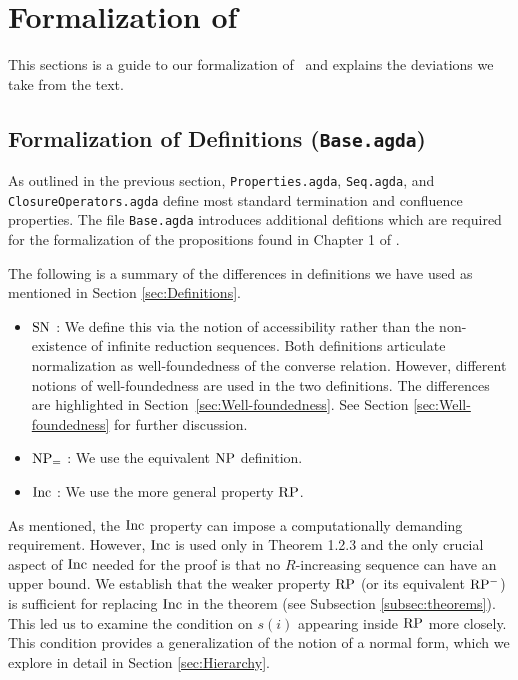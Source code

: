 \section{Formalization of \terese}
\label{sec:Formalization}
This sections is a guide to our formalization of \terese $\,$ and explains the deviations we take from the text. 

\subsection{Formalization of Definitions (\texttt{Base.agda})}\label{subsec:def}

As outlined in the previous section, \texttt{Properties.agda}, \texttt{Seq.agda}, and \texttt{ClosureOperators.agda} define most standard termination and confluence properties. The file \texttt{Base.agda} introduces additional defitions which are required for the formalization of the propositions found in Chapter 1 of \terese.


The following is a summary of the differences in definitions we have used as mentioned in Section \ref{sec:Definitions}.
\begin{itemize}
    \item $\mathrm{SN}$ : We define this via the notion of accessibility rather than the non-existence of infinite reduction sequences. Both definitions articulate normalization as well-foundedness of the converse relation. However, different notions of well-foundedness are used in the two definitions. The differences are highlighted in Section~\ref{sec:Well-foundedness}.
     See Section \ref{sec:Well-foundedness} for further discussion.
    \item $\mathrm{NP_=}$ : We use the equivalent $\mathrm{NP}$ definition.
    \item $\mathrm{Inc}$ : We use the more general property $\mathrm{RP}$.
\end{itemize}

As mentioned, the $\mathrm{Inc}$ property can impose a computationally demanding requirement. However, $\mathrm{Inc}$ is used only in Theorem 1.2.3
and the only crucial aspect of $\mathrm{Inc}$ needed for the proof is that no $R$-increasing
sequence can have an upper bound.
We establish that the weaker property $\mathrm{RP}$ (or its equivalent $\mathrm{RP^{-}}$) is sufficient for replacing $\mathrm{Inc}$ in the theorem (see Subsection \ref{subsec:theorems}).
This led us to examine the condition on $s (i)$ appearing inside $\mathrm{RP}$ more closely. This condition provides a generalization of the notion of a normal form,
which we explore in detail in Section \ref{sec:Hierarchy}.


